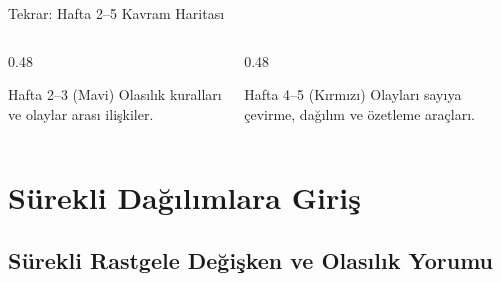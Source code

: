 \documentclass[light]{lutbeamer}
\begin{document}
\begin{frame}{Tekrar: Hafta 2--5 Kavram Haritası}

    \vspace{0.3cm}
    \begin{columns}[T]
        \begin{column}{0.48\textwidth}
            \begin{block}{Hafta 2--3 (Mavi)}
                Olasılık kuralları ve olaylar arası ilişkiler.
            \end{block}
        \end{column}
        \begin{column}{0.48\textwidth}
            \begin{block}{Hafta 4--5 (Kırmızı)}
                Olayları sayıya çevirme, dağılım ve özetleme araçları.
            \end{block}
        \end{column}
    \end{columns}
\end{frame}


\section{Sürekli Dağılımlara Giriş}
\subsection{Sürekli Rastgele Değişken ve Olasılık Yorumu}
\end{document}
